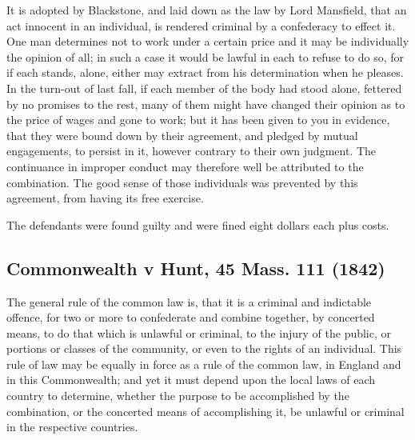 \documentclass[
  letterpaper,
  11pt,
  DIV=9,
  openright]{scrbook}
\begin{document}
It is adopted by Blackstone, and laid down as the law by Lord Mansfield,
that an act innocent in an individual, is rendered criminal by a
confederacy to effect it. One man determines not to work under a certain
price and it may be individually the opinion of all; in such a case it
would be lawful in each to refuse to do so, for if each stands, alone,
either may extract from his determination when he pleases. In the
turn-out of last fall, if each member of the body had stood alone,
fettered by no promises to the rest, many of them might have changed
their opinion as to the price of wages and gone to work; but it has been
given to you in evidence, that they were bound down by their agreement,
and pledged by mutual engagements, to persist in it, however contrary to
their own judgment. The continuance in improper conduct may therefore
well be attributed to the combination. The good sense of those
individuals was prevented by this agreement, from having its free
exercise.



The defendants were found guilty and were fined eight dollars each plus
costs.

\subsection{Commonwealth v Hunt, 45 Mass. 111
(1842)}\label{commonwealth-v-hunt-45-mass.-111-1842}

The general rule of the common law is, that it is a criminal and
indictable offence, for two or more to confederate and combine together,
by concerted means, to do that which is unlawful or criminal, to the
injury of the public, or portions or classes of the community, or even
to the rights of an individual. This rule of law may be equally in force
as a rule of the common law, in England and in this Commonwealth; and
yet it must depend upon the local laws of each country to determine,
whether the purpose to be accomplished by the combination, or the
concerted means of accomplishing it, be unlawful or criminal in the
respective countries.
\end{document}
